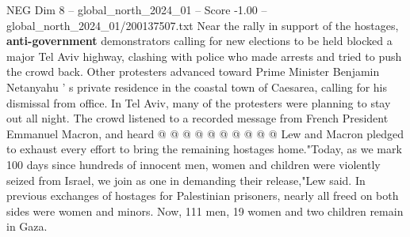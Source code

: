 \begin{textsample}{NEG Dim 8 – global\_north\_2024\_01 – Score -1.00 – global\_north\_2024\_01/200137507.txt}
Near the rally in support of the hostages, \textbf{anti-government} demonstrators calling for new elections to be held blocked a major Tel Aviv highway, clashing with police who made arrests and tried to push the crowd back.
Other protesters advanced toward Prime Minister Benjamin Netanyahu ' s private residence in the coastal town of Caesarea, calling for his dismissal from office.
In Tel Aviv, many of the protesters were planning to stay out all night.
The crowd listened to a recorded message from French President Emmanuel Macron, and heard @ @ @ @ @ @ @ @ @ @ Lew and Macron pledged to exhaust every effort to bring the remaining hostages home."Today, as we mark 100 days since hundreds of innocent men, women and children were violently seized from Israel, we join as one in demanding their release,"Lew said.
In previous exchanges of hostages for Palestinian prisoners, nearly all freed on both sides were women and minors.
Now, 111 men, 19 women and two children remain in Gaza.

\end{textsample}
